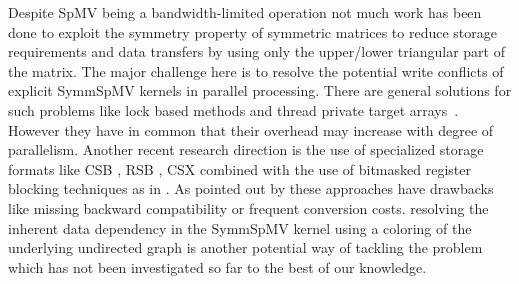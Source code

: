 


Despite \acrshort{SpMV} being a bandwidth-limited operation not much work has 
been done to exploit the symmetry property of symmetric matrices to reduce
storage requirements and data transfers by using only the upper/lower triangular part of the matrix.
The major challenge here is to resolve the potential write conflicts of explicit \acrshort{SymmSpMV} kernels in parallel processing.
There are general solutions for such problems like 
lock based methods and thread private target
arrays~\cite{sparseX,thread_private_symm_spmv,Krotkiewski:2010:PSS:1752612.1752682,Mironowicz:2015}. However they have in common that their overhead may increase with degree of parallelism.
Another recent research direction is the use of specialized storage formats 
like CSB \cite{CSB}, RSB \cite{RSB}, CSX \cite{sparseX} combined with the use of bitmasked 
register blocking techniques as in \cite{Buluc:2011:RMA:2058524.2059503}. As pointed out 
by \cite{liu2015spmv} these approaches have drawbacks like missing backward compatibility or frequent conversion costs. 
 resolving the inherent data dependency in the \acrshort{SymmSpMV} kernel using a \DTWO coloring of the underlying undirected graph is another potential way of tackling the problem which has not been investigated so far to the best of our knowledge. 

